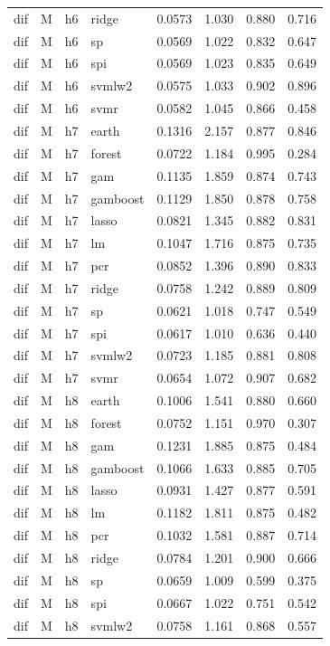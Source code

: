 \begin{ThreePartTable}
\begin{longtable}[t]{llclcccc}
dif & M & h6 & ridge & 0.0573 & 1.030 & 0.880 & 0.716\\
dif & M & h6 & sp & 0.0569 & 1.022 & 0.832 & 0.647\\
dif & M & h6 & spi & 0.0569 & 1.023 & 0.835 & 0.649\\
dif & M & h6 & svmlw2 & 0.0575 & 1.033 & 0.902 & 0.896\\
dif & M & h6 & svmr & 0.0582 & 1.045 & 0.866 & 0.458\\
\addlinespace
dif & M & h7 & earth & 0.1316 & 2.157 & 0.877 & 0.846\\
dif & M & h7 & forest & 0.0722 & 1.184 & 0.995 & 0.284\\
dif & M & h7 & gam & 0.1135 & 1.859 & 0.874 & 0.743\\
dif & M & h7 & gamboost & 0.1129 & 1.850 & 0.878 & 0.758\\
dif & M & h7 & lasso & 0.0821 & 1.345 & 0.882 & 0.831\\
dif & M & h7 & lm & 0.1047 & 1.716 & 0.875 & 0.735\\
dif & M & h7 & pcr & 0.0852 & 1.396 & 0.890 & 0.833\\
dif & M & h7 & ridge & 0.0758 & 1.242 & 0.889 & 0.809\\
dif & M & h7 & sp & 0.0621 & 1.018 & 0.747 & 0.549\\
dif & M & h7 & spi & 0.0617 & 1.010 & 0.636 & 0.440\\
dif & M & h7 & svmlw2 & 0.0723 & 1.185 & 0.881 & 0.808\\
dif & M & h7 & svmr & 0.0654 & 1.072 & 0.907 & 0.682\\
\addlinespace
dif & M & h8 & earth & 0.1006 & 1.541 & 0.880 & 0.660\\
dif & M & h8 & forest & 0.0752 & 1.151 & 0.970 & 0.307\\
dif & M & h8 & gam & 0.1231 & 1.885 & 0.875 & 0.484\\
dif & M & h8 & gamboost & 0.1066 & 1.633 & 0.885 & 0.705\\
dif & M & h8 & lasso & 0.0931 & 1.427 & 0.877 & 0.591\\
dif & M & h8 & lm & 0.1182 & 1.811 & 0.875 & 0.482\\
dif & M & h8 & pcr & 0.1032 & 1.581 & 0.887 & 0.714\\
dif & M & h8 & ridge & 0.0784 & 1.201 & 0.900 & 0.666\\
dif & M & h8 & sp & 0.0659 & 1.009 & 0.599 & 0.375\\
dif & M & h8 & spi & 0.0667 & 1.022 & 0.751 & 0.542\\
dif & M & h8 & svmlw2 & 0.0758 & 1.161 & 0.868 & 0.557\\

\end{longtable}
\end{ThreePartTable}
